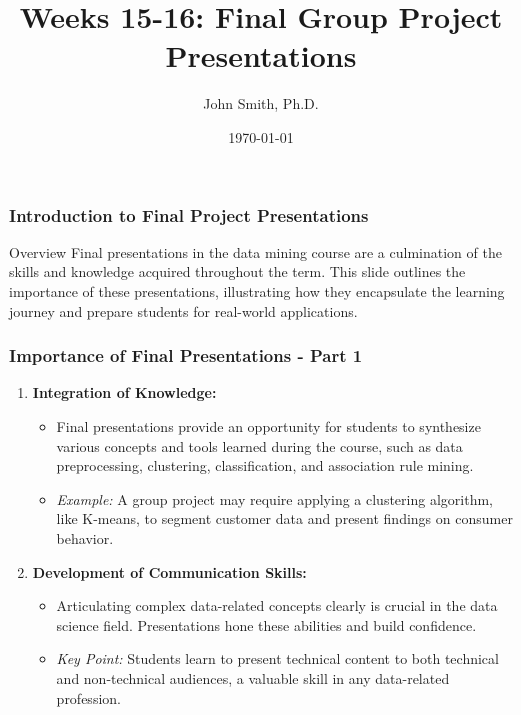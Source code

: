 \documentclass[aspectratio=169]{beamer}
\title[Final Group Project Presentations]{Weeks 15-16: Final Group Project Presentations}
\author[J. Smith]{John Smith, Ph.D.}
\institute[University Name]{
  Department of Computer Science\\
  University Name\\
  \vspace{0.3cm}
  Email: email@university.edu\\
  Website: www.university.edu
}
\date{\today}
\begin{document}
\frame{\titlepage}

\begin{frame}[fragile]
    \frametitle{Introduction to Final Project Presentations}
    \begin{block}{Overview}
        Final presentations in the data mining course are a culmination of the skills and knowledge acquired throughout the term. This slide outlines the importance of these presentations, illustrating how they encapsulate the learning journey and prepare students for real-world applications.
    \end{block}
\end{frame}

\begin{frame}[fragile]
    \frametitle{Importance of Final Presentations - Part 1}
    \begin{enumerate}
        \item \textbf{Integration of Knowledge:}
        \begin{itemize}
            \item Final presentations provide an opportunity for students to synthesize various concepts and tools learned during the course, such as data preprocessing, clustering, classification, and association rule mining.
            \item \textit{Example:} A group project may require applying a clustering algorithm, like K-means, to segment customer data and present findings on consumer behavior.
        \end{itemize}

        \item \textbf{Development of Communication Skills:}
        \begin{itemize}
            \item Articulating complex data-related concepts clearly is crucial in the data science field. Presentations hone these abilities and build confidence.
            \item \textit{Key Point:} Students learn to present technical content to both technical and non-technical audiences, a valuable skill in any data-related profession.
        \end{itemize}
    \end{enumerate}
\end{frame}
\end{document}
